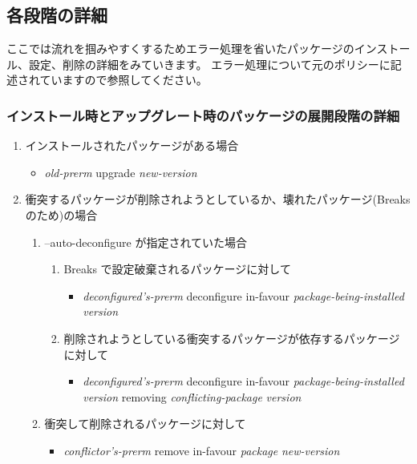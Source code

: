 \documentclass[mingoth,a4paper]{jsarticle}
\begin{document}
\subsection{各段階の詳細}
ここでは流れを掴みやすくするためエラー処理を省いたパッケージのインストール、設定、削除の詳細をみていきます。
エラー処理について元のポリシーに記述されていますので参照してください。


\subsubsection{インストール時とアップグレート時のパッケージの展開段階の詳細}
\begin{enumerate}

\item インストールされたパッケージがある場合
  \begin{itemize}
  \item {\it old-prerm} upgrade {\it new-version}
  \end{itemize}

\item 衝突するパッケージが削除されようとしているか、壊れたパッケージ(Breaks のため)の場合
  \begin{enumerate}
  \item --auto-deconfigure が指定されていた場合
    \begin{enumerate}
    \item Breaks で設定破棄されるパッケージに対して
      \begin{itemize}
      \item {\it deconfigured's-prerm} deconfigure in-favour {\it package-being-installed} {\it version}
      \end{itemize}
    \item 削除されようとしている衝突するパッケージが依存するパッケージに対して
      \begin{itemize}
      \item {\it deconfigured's-prerm} deconfigure in-favour {\it package-being-installed} {\it version} removing {\it conflicting-package} {\it version}
      \end{itemize}
    \end{enumerate}
  \item 衝突して削除されるパッケージに対して
    \begin{itemize}
    \item {\it conflictor's-prerm} remove in-favour {\it package} {\it new-version}
    \end{itemize}
  \end{enumerate}


\end{enumerate}
\end{document}
